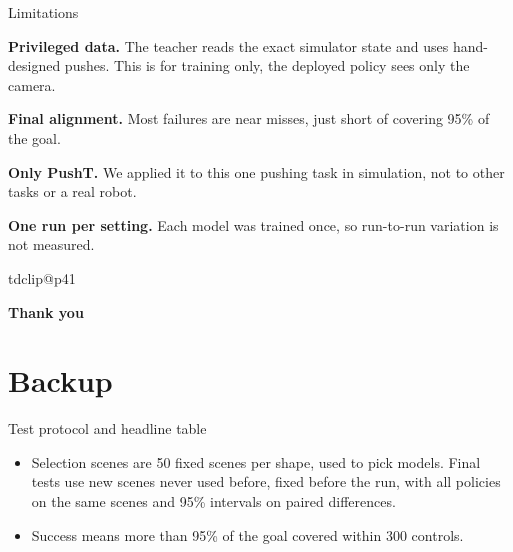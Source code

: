 \documentclass[aspectratio=169,11pt,t]{beamer}
\makeatletter
\newcommand{\tdcurrentclipid}{}
\newcommand{\slidevideo}[1]{%
\gdef\tdcurrentclipid{#1}%
\csname tdclip@#1\endcsname%
\ignorespaces}
\newcommand{\statnum}[1]{{\fontsize{15}{18}\selectfont\bfseries #1}}
\newcommand{\cours}{\color{tdblue}}
\newcommand{\tab}[1]{}
\newcommand{\tk}[2]{\noindent\makebox[9mm][l]{\statnum{\cours#1}}%
  \parbox[t]{134mm}{\raggedright\fontsize{12.5}{15.5}\selectfont #2}\par\vspace{4mm}}
\makeatother
\begin{document}
\begin{frame}{Limitations}
  \vspace{4mm}
  \tk{1}{\textbf{Privileged data.} The teacher reads the exact simulator state and uses hand-designed pushes. This is
    for training only, the deployed policy sees only the camera.}
  \tk{2}{\textbf{Final alignment.} Most failures are near misses, just short of covering 95\% of the goal.}
  \tk{3}{\textbf{Only PushT.} We applied it to this one pushing task in simulation, not to other tasks or a real
    robot.}
  \tk{4}{\textbf{One run per setting.} Each model was trained once, so run-to-run variation is not measured.}
\end{frame}

\begin{frame}[plain]
\slidevideo{p41}
  \vspace*{7mm}
  {\fontsize{30}{33}\selectfont\bfseries Thank you\par}
\end{frame}



\appendix
\section{Backup}
\begin{frame}{Test protocol and headline table}
  \begin{itemize}
    \item Selection scenes are 50 fixed scenes per shape, used to pick models. Final tests use new scenes never used
          before, fixed before the run, with all policies on the same scenes and 95\% intervals on paired differences.
    \item Success means more than 95\% of the goal covered within 300 controls.
  \end{itemize}
  \vspace{1mm}
  \centering\adjustbox{max width=\textwidth}{\small\tab{final_headline.tex}}
\end{frame}
\end{document}

